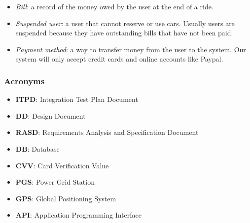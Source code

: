 \documentclass[english]{article}
\begin{document}
\begin{itemize}
\item{\textit{Bill}: a record of the money owed by the user at the end of a ride.}
\item{\textit{Suspended user}: a user that cannot reserve or use cars. Usually users are suspended because they have outstanding bills that have not been paid.}
\item{\textit{Payment method}: a way to transfer money from the user to the system. Our system will only accept credit cards and online accounts like Paypal.}
\end{itemize}

\subsubsection{Acronyms}
\begin{itemize}
\item{\textbf{ITPD}: Integration Test Plan Document}
\item{\textbf{DD}: Design Document}
\item{\textbf{RASD}: Requirements Analysis and Specification Document}
\item{\textbf{DB}: Database}
\item{\textbf{CVV}: Card Verification Value}
\item{\textbf{PGS}: Power Grid Station}
\item{\textbf{GPS}: Global Positioning System}
\item{\textbf{API}: Application Programming Interface}
\end{itemize}

\end{document}
